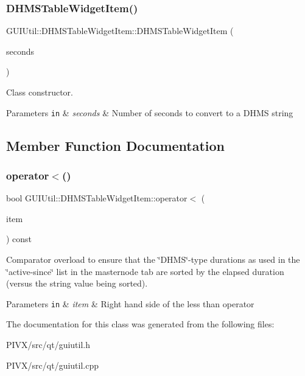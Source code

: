 \subsubsection{\texorpdfstring{D\+H\+M\+S\+Table\+Widget\+Item()}{DHMSTableWidgetItem()}}
{\footnotesize\ttfamily G\+U\+I\+Util\+::\+D\+H\+M\+S\+Table\+Widget\+Item\+::\+D\+H\+M\+S\+Table\+Widget\+Item (\begin{DoxyParamCaption}\item[{const int64\+\_\+t}]{seconds }\end{DoxyParamCaption})}

Class constructor. 
\begin{DoxyParams}[1]{Parameters}
\mbox{\tt in}  & {\em seconds} & Number of seconds to convert to a D\+H\+MS string \\
\hline
\end{DoxyParams}


\subsection{Member Function Documentation}
\mbox{\label{class_g_u_i_util_1_1_d_h_m_s_table_widget_item_ab386d4d66b8eb16a216ddaf73d1799fa}} 
\subsubsection{\texorpdfstring{operator$<$()}{operator<()}}
{\footnotesize\ttfamily bool G\+U\+I\+Util\+::\+D\+H\+M\+S\+Table\+Widget\+Item\+::operator$<$ (\begin{DoxyParamCaption}\item[{Q\+Table\+Widget\+Item const \&}]{item }\end{DoxyParamCaption}) const\hspace{0.3cm}{\ttfamily [virtual]}}

Comparator overload to ensure that the \char`\"{}\+D\+H\+M\+S\char`\"{}-\/type durations as used in the \char`\"{}active-\/since\char`\"{} list in the masternode tab are sorted by the elapsed duration (versus the string value being sorted). 
\begin{DoxyParams}[1]{Parameters}
\mbox{\tt in}  & {\em item} & Right hand side of the less than operator \\
\hline
\end{DoxyParams}


The documentation for this class was generated from the following files\+:\begin{DoxyCompactItemize}
\item 
P\+I\+V\+X/src/qt/guiutil.\+h\item 
P\+I\+V\+X/src/qt/guiutil.\+cpp\end{DoxyCompactItemize}
